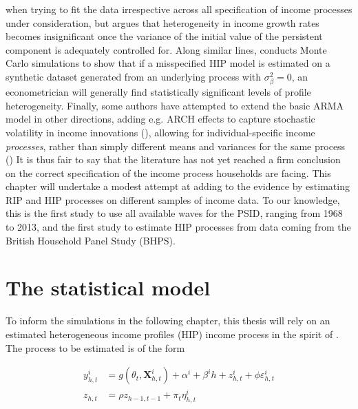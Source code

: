 when trying to fit the data irrespective across all specification of income 
processes under consideration, but argues that heterogeneity in income growth
rates becomes insignificant once the variance of the initial value of the 
persistent component is adequately controlled for. Along similar lines, \citet{Hryshko2012} 
conducts Monte Carlo simulations to show that if a misspecified HIP model is 
estimated on a synthetic dataset generated from an underlying process with
$\sigma^2_{\beta}=0$, an econometrician will generally find statistically 
significant levels of profile heterogeneity. 
Finally, some authors have attempted to extend the basic ARMA model in other 
directions, adding e.g. ARCH effects to capture stochastic volatility in income
innovations (\citealt{MeghirPistaferri2004}), allowing for individual-specific
income \textit{processes}, rather than simply different means and variances for 
the same process (\citealt{BrowningEjrnaesAlvarez2010})
It is thus fair to say that the literature has not yet reached a firm conclusion 
on the correct specification of the income process households are facing. This 
chapter will undertake a modest attempt at adding to the evidence by estimating
RIP and HIP processes on different samples of income data. To our knowledge, 
this is the first study to use all available waves for the PSID, ranging from 
1968 to 2013, and the first study to estimate HIP processes from data coming
from the British Household Panel Study (BHPS).

\section{The statistical model}
To inform the simulations in the following chapter, this thesis will rely on an
estimated heterogeneous income profiles (HIP) income process in the spirit of
\citet{Guvenen2009}. The process to be estimated is of the form

\begin{align}
y_{h,t}^i &= g(\theta_t, \pmb{X}_{h,t}^i) + \alpha^i + \beta^i h + z_{h,t}^i + \phi \varepsilon_{h,t}^i \label{incproc} \\
z_{h,t} &= \rho z_{h-1,t-1} + \pi_t \eta_{h,t}^i \label{persshock}
\end{align}

